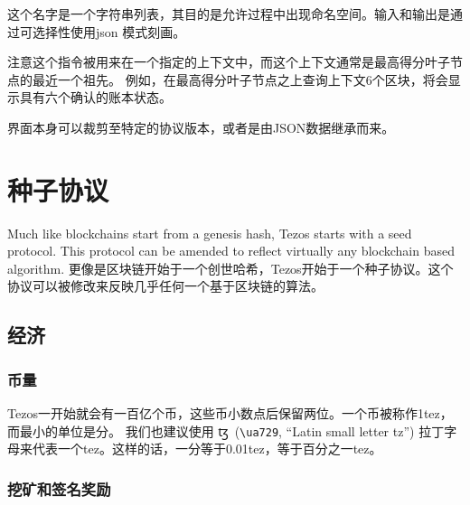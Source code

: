 \documentclass[letterpaper]{article}
\newcommand{\tz}{{\fontspec{DejaVu Sans} \small{ꜩ}}}
\begin{document}
这个名字是一个字符串列表，其目的是允许过程中出现命名空间。输入和输出是通过可选择性使用json 模式刻画。

注意这个指令被用来在一个指定的上下文中，而这个上下文通常是最高得分叶子节点的最近一个祖先。
例如，在最高得分叶子节点之上查询上下文6个区块，将会显示具有六个确认的账本状态。

界面本身可以裁剪至特定的协议版本，或者是由JSON数据继承而来。

\section{种子协议}
Much like blockchains start from a genesis hash, Tezos starts with a seed
protocol. This protocol can be amended to reflect virtually any blockchain based
algorithm.
更像是区块链开始于一个创世哈希，Tezos开始于一个种子协议。这个协议可以被修改来反映几乎任何一个基于区块链的算法。

\subsection{经济}

\subsubsection{币量}
Tezos一开始就会有一百亿个币，这些币小数点后保留两位。一个币被称作1tez，而最小的单位是分。
我们也建议使用\tz~(\verb!\ua729!, ``Latin small letter tz'') 拉丁字母来代表一个tez。这样的话，一分等于0.01tez，等于百分之一tez。

\subsubsection{挖矿和签名奖励}
\end{document}
